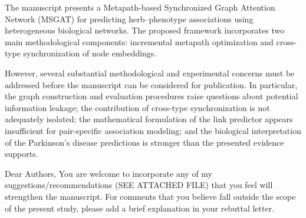 \documentclass[11pt,american]{article}
\begin{document}
The manuscript presents a Metapath-based Synchronized Graph Attention Network (MSGAT) for predicting herb--phenotype associations using heterogeneous biological networks. The proposed framework incorporates two main methodological components: incremental metapath optimization and cross-type synchronization of node embeddings.

However, several substantial methodological and experimental concerns must be addressed before the manuscript can be considered for publication. In particular, the graph construction and evaluation procedures raise questions about potential information leakage; the contribution of cross-type synchronization is not adequately isolated; the mathematical formulation of the link predictor appears insufficient for pair-specific association modeling; and the biological interpretation of the Parkinson's disease predictions is stronger than the presented evidence supports.

Dear Authors, You are welcome to incorporate any of my suggestions/recommendations (SEE ATTACHED FILE) that you feel will strengthen the manuscript. For comments that you believe fall outside the scope of the present study, please add a brief explanation in your rebuttal letter.

\end{document}
